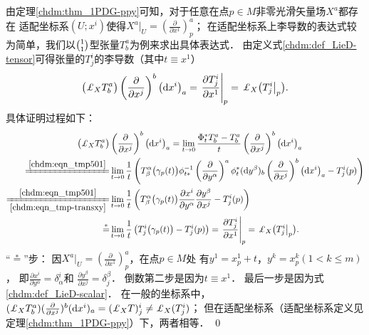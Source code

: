由定理\ref{chdm:thm_1PDG-ppy}可知，对于任意在点$p\in M$非零光滑矢量场$X^a$都存在
{\kaishu 适配坐标系}$(U;x^i)$使得$X^a |_U = (\frac{\partial }{\partial x^1} )^a_p$；
在适配坐标系上李导数的表达式较为简单，我们以$\binom{1}{1}$型张量$T_b^a$为例来求出具体表达式．
由定义式\eqref{chdm:def_LieD-tensor}可得张量的$T_{j}^{i}$的李导数（其中$t\equiv x^1$）
\begin{equation}\label{chdm:eqn_LieD-adaptedX}
    \bigl( \Lie_{X} T_{b}^{a} \bigr)
    \left(\frac{\partial }{\partial x^{j}}\right)^{b} \left({\rm d}x^i \right)_a
    = \left. \frac{\partial T_{j}^{i}}{\partial x^1 } \right|_{p} 
    =\left. \Lie_{X} \bigl(T_{j}^{i} \right|_{p} \bigr) .
\end{equation}
具体证明过程如下：
\begin{align*}
    \bigl( \Lie_{X} T_{b}^{a} \bigr)&
    \left(\frac{\partial }{\partial x^{j}}\right)^{b} \left({\rm d}x^i \right)_a
    = \lim_{t\to 0} \frac{\Phi^{*}_{t} T_{b}^{a}-T_{b}^{a}}{t}  
    \left(\frac{\partial }{\partial x^{j}}\right)^{b} \left({\rm d}x^i \right)_a \\
     \xlongequal{\ref{chdm:eqn_tmp501}}&  \lim_{t\to 0} \frac{1}{t}\left( 
        T^{\alpha}_{\beta}\bigl(\gamma_p(t)\bigr) \phi_{t*} ^{-1} 
         \left(\frac{\partial }{\partial y^{\alpha}}\right)^{a}
          \phi_{t}^{*}({\rm d}y^{\beta})_{b}  
          \left(\frac{\partial }{\partial x^{j}}\right)^{b} \left({\rm d}x^i \right)_a
           -T_{j}^{i}(p) \right) \\
    \xlongequal[\ref{chdm:eqn_tmp-transxy}]{\ref{chdm:eqn_tmp501}}&
    \lim_{t\to 0} \frac{1}{t}\left( T^{\alpha}_{\beta}\bigl(\gamma_p(t)\bigr) 
    \frac{\partial x^i}{\partial y^{\alpha}} \frac{\partial y^\beta}{\partial x^{j}}
    -T_{j}^{i}(p) \right) \\
    \overset{*}{=}&  \lim_{t\to 0} \frac{1}{t}\left( T_{j}^{i}\bigl(\gamma_p(t)\bigr)   -T_{j}^{i}(p) \right) 
    = \left. \frac{\partial T_{j}^{i}}{\partial x^1 } \right|_{p} 
    =\left. \Lie_{X} \bigl(T_{j}^{i} \right|_{p} \bigr) .
\end{align*}
“$\overset{*}{=}$”步：
因$X^a |_U = (\frac{\partial }{\partial x^1} )^a_p$，在点$p\in M$处
有$y^1=x^1_p+t$，$y^k =x^k_p (1< k \leqslant m)$，
即$\frac{\partial x^i}{\partial y^{\alpha}}=\delta^i_\alpha$和
$\frac{\partial y^\beta}{\partial x^{j}}=\delta^\beta_j$．
倒数第二步是因为$t\equiv x^1$．
最后一步是因为式\eqref{chdm:def_LieD-scalar}．
在一般的坐标系中，$( \Lie_{X} T_{b}^{a} )
(\frac{\partial }{\partial x^{j}})^{b} ({\rm d}x^i )_a 
= ( \Lie_{X} T ) _{j}^{i} \neq  \Lie_{X} (T  _{j}^{i})$；
但在适配坐标系（适配坐标系定义见定理\ref{chdm:thm_1PDG-ppy}）下，两者相等．
\qed


